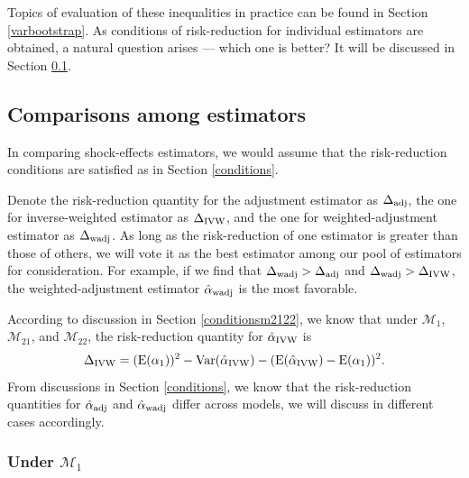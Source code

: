 \documentclass[11pt]{article}
\def\mc#1{\mathcal{#1}} %
\def\E#1{\mathrm{E}(#1)} %
\def\var#1{\mathrm{Var}(#1)} %
\theoremstyle{definition}
\begin{document}
Topics of  evaluation of these inequalities in practice can be found in Section \ref{varbootstrap}. As conditions of risk-reduction for individual estimators are obtained, a natural question arises --- which one is better? It will be discussed in Section \ref{comparisons}.



 

\subsection{Comparisons among estimators}

\label{comparisons}

In comparing  shock-effects estimators, we would assume that the risk-reduction conditions are satisfied as in Section \ref{conditions}.  

Denote the risk-reduction quantity for the adjustment estimator as $\Delta_{\rm adj}$, the one for inverse-weighted estimator as $\Delta_{\rm IVW}$, and the one for weighted-adjustment estimator as $\Delta_{\rm wadj}$. As long as the risk-reduction of one estimator is greater than those of others, we will vote it as the best estimator among our pool of estimators for consideration. For example, if we find that $\Delta_{\rm wadj}>\Delta_{\rm adj}$ and $\Delta_{\rm wadj}>\Delta_{\rm IVW}$, the weighted-adjustment estimator $\hat{\alpha}_{\rm wadj}$ is the most favorable.


According to  discussion in Section \ref{conditionsm2122}, we know that under $\mc{M}_{1}$, $\mc{M}_{21}$, and $\mc{M}_{22}$, the risk-reduction quantity for $\hat{\alpha}_{\rm IVW}$ is
\begin{align*}
  \Delta_{\rm IVW} = (\E{\alpha_1})^2- \var{\hat{\alpha}_{\rm IVW}} -(\E{\hat{\alpha}_{\rm IVW}}-\E{\alpha_1})^2.
\end{align*}
From discussions in Section \ref{conditions}, we know that the risk-reduction quantities for $\hat{\alpha}_{\rm adj}$ and $\hat{\alpha}_{\rm wadj}$ differ across models, we will discuss in different cases accordingly.


\subsubsection{Under $\mc{M}_{1}$}
\end{document}
